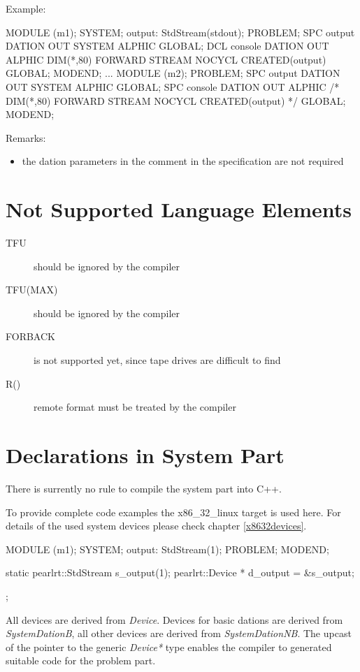 Example:
\begin{PEARLCode}
MODULE (m1);
SYSTEM;
   output: StdStream(stdout);
PROBLEM;
   SPC output  DATION OUT SYSTEM ALPHIC GLOBAL;
   DCL console DATION OUT ALPHIC DIM(*,80) FORWARD STREAM NOCYCL CREATED(output) GLOBAL;
MODEND;
...
MODULE (m2);
PROBLEM;
   SPC output  DATION OUT SYSTEM ALPHIC GLOBAL;
   SPC console DATION OUT ALPHIC /* DIM(*,80) FORWARD STREAM NOCYCL CREATED(output) */ GLOBAL;
MODEND;
\end{PEARLCode}

Remarks:
\begin{itemize}
\item the dation parameters in the comment in the specification
   are not required 
\end{itemize}

\section{Not Supported Language Elements}
\begin{description}
\item[TFU] should be ignored by the compiler
\item[TFU(MAX)] should be ignored by the compiler
\item[FORBACK] is not supported yet, since tape drives are
   difficult to find
\item[R()] remote format must be treated by the compiler
\end{description}

\section{Declarations in System Part}
There is surrently no rule to compile the system part into C++.

To provide complete code examples the x86\_32\_linux target is used here.
For details of the used system devices please check chapter \ref{x8632devices}.

\begin{PEARLCode}
MODULE (m1);
SYSTEM;
   output: StdStream(1);
PROBLEM;
MODEND;
\end{PEARLCode}

\begin{CppCode}
static pearlrt::StdStream s_output(1);
       pearlrt::Device * d_output = &s_output;
\end{CppCode};

All devices are derived from {\em Device}.
Devices for basic dations are derived from {\em SystemDationB},
all other devices are derived from {\em SystemDationNB}.
The upcast of the pointer
to the generic {\em Device*} type enables the compiler to generated 
suitable code for the problem part.

